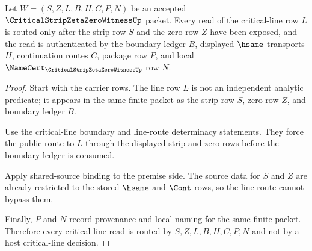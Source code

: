 \begin{theorem}
\label{thm:critical-strip-zeta-zero-line-boundary-routing}
Let $W=(S,Z,L,B,H,C,P,N)$ be an accepted $\CriticalStripZetaZeroWitnessUp$ packet. Every read of the critical-line row $L$ is routed only after the strip row $S$ and the zero row $Z$ have been exposed, and the read is authenticated by the boundary ledger $B$, displayed $\hsame$ transports $H$, continuation routes $C$, package row $P$, and local $\NameCert_{\CriticalStripZetaZeroWitnessUp}$ row $N$.
\end{theorem}
\begin{proof}
Start with the carrier rows. The line row $L$ is not an independent analytic predicate; it appears in the same finite packet as the strip row $S$, zero row $Z$, and boundary ledger $B$.

Use the critical-line boundary and line-route determinacy statements. They force the public route to $L$ through the displayed strip and zero rows before the boundary ledger is consumed.

Apply shared-source binding to the premise side. The source data for $S$ and $Z$ are already restricted to the stored $\hsame$ and $\Cont$ rows, so the line route cannot bypass them.

Finally, $P$ and $N$ record provenance and local naming for the same finite packet. Therefore every critical-line read is routed by $S,Z,L,B,H,C,P,N$ and not by a host critical-line decision.
\end{proof}


